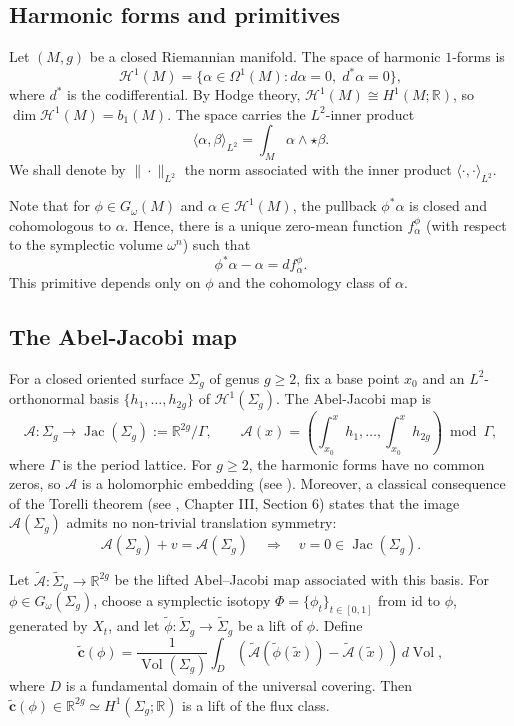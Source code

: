 \documentclass[11pt]{article}
\theoremstyle{definition}
\newcommand{\Jac}{\operatorname{Jac}}
\begin{document}
	\subsection{Harmonic forms and primitives}
	
	Let $(M,g)$ be a closed Riemannian manifold. The space of harmonic $1$-forms is
	\[
	\mathcal H^1(M)=\{\alpha\in\Omega^1(M): d\alpha=0,\; d^*\alpha=0\},
	\]
	where $d^*$ is the codifferential. By Hodge theory, $\mathcal H^1(M)\cong
	H^1(M;\mathbb R)$, so $\dim\mathcal H^1(M)=b_1(M)$. The space carries the
	$L^2$-inner product 
	\[
	\langle \alpha,\beta\rangle_{L^2}=\int_M \alpha\wedge\star\beta.
	\]  
	We shall denote by $\|\cdot\|_{L^2}$ the norm associated with the inner product
	$\langle \cdot,\cdot\rangle_{L^2}$.
	
	Note that for $\phi\in G_\omega(M)$ and $\alpha\in\mathcal H^1(M)$, the pullback
	$\phi^*\alpha$ is closed and cohomologous to $\alpha$. Hence, there is a unique
	zero-mean function $f_\alpha^\phi$ (with respect to the symplectic volume
	$\omega^n$) such that
	\[
	\phi^*\alpha - \alpha = d f_\alpha^\phi.
	\]
	This primitive depends only on $\phi$ and the cohomology class of $\alpha$.
	
	\subsection{The Abel-Jacobi map}
	
	For a closed oriented surface $\Sigma_g$ of genus $g\ge 2$, fix a base point
	$x_0$ and an $L^2$-orthonormal basis $\{h_1,\dots,h_{2g}\}$ of $\mathcal
	H^1(\Sigma_g)$. The Abel-Jacobi map is
	\[
	\mathcal A:\Sigma_g \longrightarrow \operatorname{Jac}(\Sigma_g):=\mathbb
	R^{2g}/\Gamma,
	\qquad
	\mathcal A(x)=\left(\int_{x_0}^x h_1,\dots,\int_{x_0}^x h_{2g}\right)\bmod\Gamma,
	\]
	where $\Gamma$ is the period lattice. For $g\ge2$, the harmonic forms have no
	common zeros, so $\mathcal A$ is a holomorphic embedding (see
	\cite{GriffithsHarris}). Moreover, a classical consequence of the Torelli
	theorem (see \cite{GriffithsHarris}, Chapter III, Section 6) states that the
	image $\mathcal A(\Sigma_g)$ admits no non-trivial translation symmetry:
	\[
	\mathcal A(\Sigma_g) + v = \mathcal A(\Sigma_g) \quad \Longrightarrow \quad v =
	0 \in \Jac(\Sigma_g).
	\]
	
	Let $\widetilde{\mathcal A}:\widetilde{\Sigma}_g\rightarrow\mathbb R^{2g}$ be
	the lifted Abel--Jacobi map associated with this basis. For $\phi\in
	G_\omega(\Sigma_g)$, choose a symplectic isotopy $\Phi=\{\phi_t\}_{t\in[0,1]}$
	from $\mathrm{id}$ to $\phi$, generated by $X_t$, and let $\widetilde\phi:
	\widetilde{\Sigma}_g\rightarrow\widetilde{\Sigma}_g$ be a lift of $\phi$.
	Define
	\[
	\widetilde{\mathbf c}(\phi)
	=
	\frac1{\operatorname{Vol}(\Sigma_g)}
	\int_D
	\left(
	\widetilde{\mathcal A}(\widetilde\phi(\tilde x))
	-
	\widetilde{\mathcal A}(\tilde x)
	\right)
	\,d\operatorname{Vol},
	\]
	where $D$ is a fundamental domain of the universal covering. Then
	$\widetilde{\mathbf c}(\phi)\in \mathbb R^{2g} \simeq H^1(\Sigma_g;\mathbb
	R)$ is a lift of the flux class.
	
\end{document}
